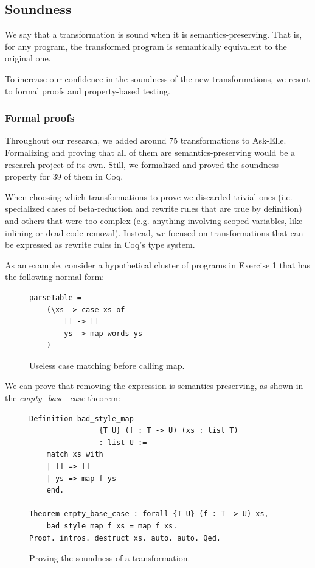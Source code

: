 \subsection{Soundness}

We say that a transformation is sound when it is semantics-preserving. That is, for any program, the transformed program is semantically equivalent to the original one.

To increase our confidence in the soundness of the new transformations, we resort to formal proofs and property-based testing.

\subsubsection{Formal proofs}

Throughout our research, we added around 75 transformations to Ask-Elle. Formalizing and proving that all of them are semantics-preserving would be a research project of its own. Still, we formalized and proved the soundness property for 39 of them in Coq.

When choosing which transformations to prove we discarded trivial ones (i.e. specialized cases of beta-reduction and rewrite rules that are true by definition) and others that were too complex (e.g. anything involving scoped variables, like inlining or dead code removal). Instead, we focused on transformations that can be expressed as rewrite rules in Coq's type system.

As an example, consider a hypothetical cluster of programs in Exercise 1 that has the following normal form:

\begin{figure}[H]
\centering
\begin{verbatim}
parseTable =
    (\xs -> case xs of
        [] -> []
        ys -> map words ys
    )
\end{verbatim}
\caption{Useless case matching before calling map.}
\label{fig:method-bad-style-map}
\end{figure}

We can prove that removing the  expression is semantics-preserving, as shown in the \emph{empty\_base\_case} theorem:

\begin{figure}[H]
\centering
\begin{verbatim}
Definition bad_style_map
                {T U} (f : T -> U) (xs : list T)
                : list U :=
    match xs with
    | [] => []
    | ys => map f ys
    end.

Theorem empty_base_case : forall {T U} (f : T -> U) xs,
    bad_style_map f xs = map f xs.
Proof. intros. destruct xs. auto. auto. Qed.
\end{verbatim}
\caption{Proving the soundness of a transformation.}
\end{figure}

